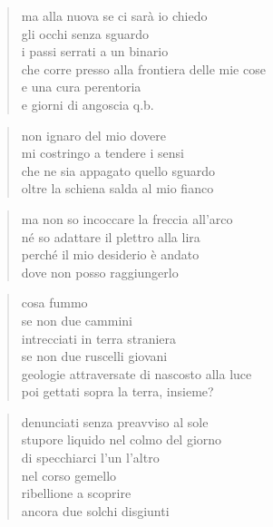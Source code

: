 	\begin{verse}
		ma alla nuova se ci sarà io chiedo\\
		gli occhi senza sguardo\\
		i passi serrati a un binario\\
		che corre presso alla frontiera delle mie cose\\
		e una cura perentoria\\
		e giorni di angoscia q.b.
	\end{verse}

\clearpage


\vspace*{2cm}

	\begin{verse}
		non ignaro del mio dovere\\
		mi costringo a tendere i sensi\\
		che ne sia appagato quello sguardo\\
		oltre la schiena salda al mio fianco
	\end{verse}

	\begin{verse}
		ma non so incoccare la freccia all'arco\\
		né so adattare il plettro alla lira\\
		perché il mio desiderio è andato\\
		dove non posso raggiungerlo
	\end{verse}

\clearpage


\vspace*{2cm}

	\begin{verse}
		cosa fummo\\
		se non due cammini\\
		intrecciati in terra straniera\\
		se non due ruscelli giovani\\
		geologie attraversate di nascosto alla luce\\
		poi gettati sopra la terra, insieme?
	\end{verse}

	\begin{verse}
		denunciati senza preavviso al sole\\
		stupore liquido nel colmo del giorno\\
		di specchiarci l'un l'altro\\
		nel corso gemello\\
		ribellione a scoprire\\
		ancora due solchi disgiunti
	\end{verse}


